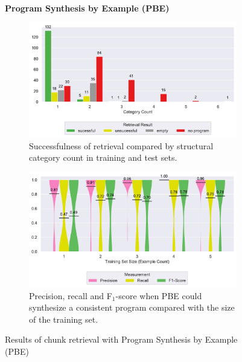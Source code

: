 \begin{figure}
\centering
    \textbf{Program Synthesis by Example (PBE)}\par\medskip
\begin{subfigure}[b]{\columnwidth}
		\centering
		\includegraphics[width=\columnwidth,
		clip]{img/big-study/failure-reason-categorycount-PBE.pdf}
				\caption{Successfulness of retrieval
				compared by structural category count
				in training and test sets.}
		\label{fig:failure-reason-categorycount-PBE}
\end{subfigure}\hspace{\fill}
\begin{subfigure}[b]{\columnwidth}
		\centering
		\includegraphics[width=\columnwidth,
		clip]{img/big-study/recall-precision-examplecount-sythesisworked-PBE.pdf}
				\caption{Precision, recall and
				F$_{1}$-score when PBE could synthesize
				a consistent program compared with the
				size of the training set.}
		\label{fig:recall-precision-examplecount-sythesisworked-PBE}
\end{subfigure}
\caption{Results of chunk retrieval with  Program Synthesis by Example
(PBE)}
\end{figure}

